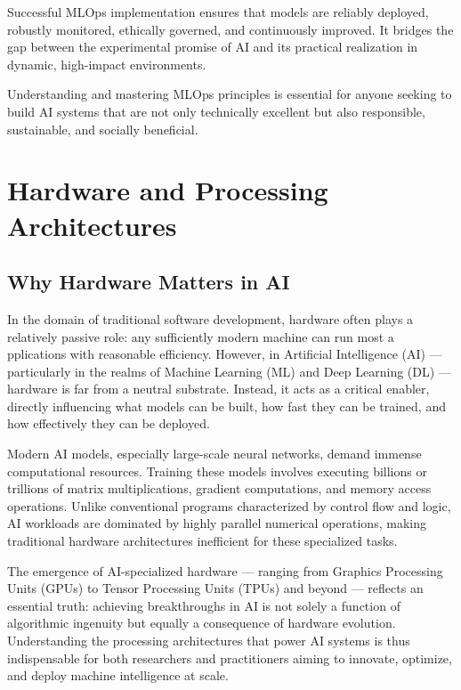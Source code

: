 \documentclass[openany]{book}
\begin{document}
Successful MLOps implementation ensures that models are reliably deployed, 
robustly monitored, ethically governed, and continuously improved. It bridges 
the gap between the experimental promise of AI and its practical realization in 
dynamic, high-impact environments.

Understanding and mastering MLOps principles is essential for anyone seeking to 
build AI systems that are not only technically excellent but also responsible, 
sustainable, and socially beneficial.


\chapter{Hardware and Processing Architectures}

\section{Why Hardware Matters in AI}

In the domain of traditional software development, hardware often plays a 
relatively passive role: any sufficiently modern machine can run most a
pplications with reasonable efficiency. However, in Artificial Intelligence (AI) 
— particularly in the realms of Machine Learning (ML) and Deep Learning (DL) — 
hardware is far from a neutral substrate. Instead, it acts as a critical 
enabler, directly influencing what models can be built, how fast they can be 
trained, and how effectively they can be deployed.

Modern AI models, especially large-scale neural networks, demand immense 
computational resources. Training these models involves executing billions or 
trillions of matrix multiplications, gradient computations, and memory access 
operations. Unlike conventional programs characterized by control flow and 
logic, AI workloads are dominated by highly parallel numerical operations, 
making traditional hardware architectures inefficient for these specialized 
tasks.

The emergence of AI-specialized hardware — ranging from Graphics Processing 
Units (GPUs) to Tensor Processing Units (TPUs) and beyond — reflects an 
essential truth: achieving breakthroughs in AI is not solely a function of 
algorithmic ingenuity but equally a consequence of hardware evolution. 
Understanding the processing architectures that power AI systems is thus 
indispensable for both researchers and practitioners aiming to innovate, 
optimize, and deploy machine intelligence at scale.
\end{document}
